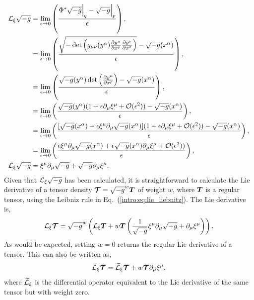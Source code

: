 \begin{align}
\mathcal{L}_\xi \sqrt{-g} &= \lim_{\epsilon\rightarrow 0 }\left( \frac{\Phi^*\sqrt{-\tilde{g}}\Big|_q-\sqrt{-g}\Big|_p}{\epsilon} \right) ,\\
&= \lim_{\epsilon\rightarrow 0 }\left( \frac{\sqrt{-\det\left(g_{\mu\nu}(y^\alpha){\frac{\partial y^\mu}{\partial x^\rho}  \frac{\partial y^\nu}{\partial x^\sigma}}\right)}-\sqrt{-g}(x^\alpha)}{\epsilon} \right) ,\\
&= \lim_{\epsilon\rightarrow 0 }\left( \frac{\sqrt{-g}(y^\alpha) \det\left(\frac{\partial y^\mu}{\partial x^\rho}\right) -\sqrt{-g}(x^\alpha)}{\epsilon} \right) ,\\
&= \lim_{\epsilon\rightarrow 0 }\left( \frac{\sqrt{-g}(y^\alpha) (1 + \epsilon \partial_\mu \xi^\mu + \mathcal{O}(\epsilon^2)) -\sqrt{-g}(x^\alpha)}{\epsilon} \right) ,\\
&= \lim_{\epsilon\rightarrow 0 }\left( \frac{[\sqrt{-g}(x^\alpha) + \epsilon \xi^\mu \partial_\mu \sqrt{-g}(x^\alpha)] (1 + \epsilon \partial_\mu \xi^\mu + \mathcal{O}(\epsilon^2)) -\sqrt{-g}(x^\alpha)}{\epsilon} \right) ,\\
&= \lim_{\epsilon\rightarrow 0 }\left( \frac{ \epsilon \xi^\mu \partial_\mu \sqrt{-g}(x^\alpha) + \epsilon \sqrt{-g}(x^\alpha)\partial_\mu \xi^\mu + \mathcal{O}(\epsilon^2))}{\epsilon}  \right) ,\\
\mathcal{L}_\xi \sqrt{-g} &= \xi^\mu \partial_\mu \sqrt{-g} + \sqrt{-g} \partial_\mu \xi^\mu.
\end{align}
Given that $\mathcal{L}_\xi \sqrt{-g}$ has been calculated, it is straightforward to calculate the Lie derivative of a tensor density $\boldsymbol{\mathcal{T}} = \sqrt{-g}^w\boldsymbol{T}$ of weight $w$, where $\boldsymbol{T}$ is a regular tensor, using the Leibniz rule in Eq.~(\ref{intro:eq:lie_liebnitz}). The Lie derivative is,
\begin{equation} \label{intro:eq:Ltensordensity}
\mathcal{L}_\xi \boldsymbol{\mathcal{T}} = \sqrt{-g}^w \left( \mathcal{L}_\xi \boldsymbol{T} + w \boldsymbol{T} \left(   \frac{1}{\sqrt{-g}} \xi^\mu \partial_\mu \sqrt{-g} + \partial_\mu \xi^\mu \right) \right).
\end{equation}
As would be expected, setting $w=0$ returns the regular Lie derivative of a tensor. This can also be written as, 
\begin{equation} \label{intro:eq:Ltensordensity2}
\mathcal{L}_\xi \boldsymbol{\mathcal{T}} =  \widetilde{\mathcal{L}}_\xi \boldsymbol{\mathcal{T}} + w \boldsymbol{\mathcal{T}}  \partial_\mu \xi^\mu ,
\end{equation}
where $ \widetilde{\mathcal{L}}_\xi$ is the differential operator equivalent to the Lie derivative of the same tensor but with weight zero.





